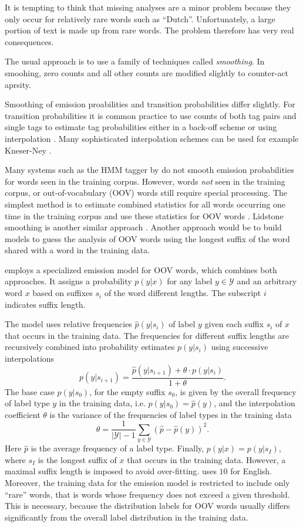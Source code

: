 It is tempting to think that missing analyses are a minor problem
because they only occur for relatively rare words such as
``Dutch''. Unfortunately, a large portion of text is made up from rare
words. The problem therefore has very real consequences.

The usual approach is to use a family of techniques called {\it
  smoothing}. In smoohing, zero counts and all other counts are
modified slightly to counter-act aprsity.

Smoothing of emission proabilities and transition probabilities differ
slightly. For transition probabilities it is common practice to use
counts of both tag pairs and single tags to estimate tag probabilities
either in a back-off scheme \citep{foo} or using interpolation
\citep{Brants2000}. Many sophisticated interpolation schemes can be
used for example Kneser-Ney \citep{foo}.

Many systems such as the HMM tagger by \cite{Brants2000} do not smooth
emission probabilities for words seen in the training corpus. However,
words {\it not} seen in the training corpus, or out-of-vocabulary
(OOV) words still require special processing. The simplest method is
to estimate combined statistics for all words occurring one time in
the training corpus and use these statistics for OOV words
\citep{foo}. Lidstone smoothing is another similar approach
\citep{foo}. Another approach would be to build models to guess the
analysis of OOV words using the longest suffix of the word shared with
a word in the training data.

\cite{Brants2000} employs a specialized emission model for OOV words,
which combines both approaches. It assigns a probability $p(y|x)$ for
any label $y \in \mathcal{Y}$ and an arbitrary word $x$ based on
suffixes $s_i$ of the word different lengths. The subscript $i$
indicates suffix length.

The model uses relative frequencies $\hat{p}(y|s_i)$ of label $y$ given
each suffix $s_i$ of $x$ that occurs in the training data. The
frequencies for different suffix lengths are recursively combined into
probability estimates $p(y|s_i)$ using successive interpolations
$$p(y|s_{i+1}) = \frac{\hat{p}(y|s_{i+1}) + \theta \cdot p(y|s_{i})}{1 + \theta}.$$
The base case $p(y|s_0)$, for the empty suffix $s_0$, is given by the
overall frequency of label type $y$ in the training data,
i.e. $p(y|s_0) = \hat{p}(y)$, and the interpolation coefficient
$\theta$ is the variance of the frequencies of label types in the
training data
$$\theta = \frac{1}{|\mathcal{Y}| - 1} \sum_{y\in \mathcal{Y}} (\hat{p} - \hat{p}(y))^2.$$
Here $\hat{p}$ is the average frequency of a label type. Finally,
$p(y|x) = p(y|s_I)$, where $s_I$ is the longest suffix of $x$ that
occurs in the training data. However, a maximal suffix length is
imposed to avoid over-fitting. \cite{Brants2000} uses $10$ for
English. Moreover, the training data for the emission model is
restricted to include only ``rare'' words, that is words whose
frequency does not exceed a given threshold. This is necessary,
because the distribution labels for OOV words usually differs
significantly from the overall label distribution in the training
data.

